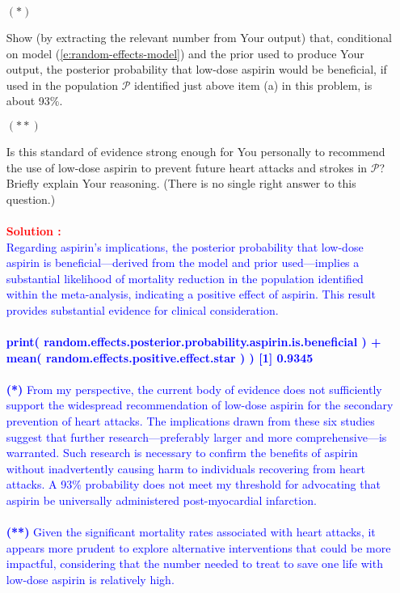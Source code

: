 \documentclass[12pt]{article}
\begin{document}
\begin{itemize}
\begin{itemize}
\begin{itemize}
\item[$( * )$]

Show (by extracting the relevant number from Your output) that, conditional on model (\ref{e:random-effects-model}) and the prior used to produce Your output, the posterior probability that low-dose aspirin would be beneficial, if used in the population $\mathcal{ P }$ identified just above item (a) in this problem, is about 93\%. \textit{\fbox{\textbf{[10 points]}}} 

\item[$( ** )$]

Is this standard of evidence strong enough for You personally to recommend the use of low-dose aspirin to prevent future heart attacks and strokes in $\mathcal{ P }$? Briefly explain Your reasoning. (There is no single right answer to this question.) \textit{\fbox{\textbf{[10 points]}}} \\ \\ 

\textcolor{red}{\textbf{Solution :}} \\
\textcolor{blue}{
Regarding aspirin's implications, the posterior probability that low-dose aspirin is beneficial—derived from the model and prior used—implies a substantial likelihood of mortality reduction in the population identified within the meta-analysis, indicating a positive effect of aspirin. This result provides substantial evidence for clinical consideration.
\\ \\ 
\textbf{print( random.effects.posterior.probability.aspirin.is.beneficial ) +
\\ mean( random.effects.positive.effect.star ) ) [1] 0.9345}
\\ \\
\textbf{(*)} From my perspective, the current body of evidence does not sufficiently support the widespread recommendation of low-dose aspirin for the secondary prevention of heart attacks. The implications drawn from these six studies suggest that further research—preferably larger and more comprehensive—is warranted. Such research is necessary to confirm the benefits of aspirin without inadvertently causing harm to individuals recovering from heart attacks. A 93\% probability does not meet my threshold for advocating that aspirin be universally administered post-myocardial infarction. 
\\ \\
\textbf{(**)} Given the significant mortality rates associated with heart attacks, it appears more prudent to explore alternative interventions that could be more impactful, considering that the number needed to treat to save one life with low-dose aspirin is relatively high.
}
\end{itemize}


\end{itemize}
\end{itemize}
\end{document}
